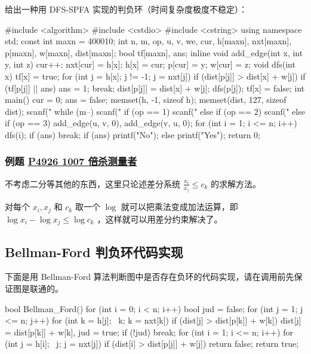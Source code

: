给出一种用 DFS-SPFA 实现的判负环（时间复杂度极度不稳定）：

\begin{cppcode}
#include <algorithm>
#include <cstdio>
#include <cstring>
using namespace std;
const int maxn = 400010;
int n, m, op, u, v, we, cur, h[maxn], nxt[maxn], p[maxn], w[maxn], dist[maxn];
bool tf[maxn], ans;
inline void add_edge(int x, int y, int z) {
  cur++;
  nxt[cur] = h[x];
  h[x] = cur;
  p[cur] = y;
  w[cur] = z;
}
void dfs(int x) {
  tf[x] = true;
  for (int j = h[x]; j != -1; j = nxt[j])
    if (dist[p[j]] > dist[x] + w[j]) {
      if (tf[p[j]] || ans) {
        ans = 1;
        break;
      }
      dist[p[j]] = dist[x] + w[j];
      dfs(p[j]);
    }
  tf[x] = false;
}
int main() {
  cur = 0;
  ans = false;
  memset(h, -1, sizeof h);
  memset(dist, 127, sizeof dist);
  scanf("%
  while (m--) {
    scanf("%
    if (op == 1)
      scanf("%
    else if (op == 2)
      scanf("%
    else if (op == 3)
      add_edge(u, v, 0), add_edge(v, u, 0);
  }
  for (int i = 1; i <= n; i++) {
    dfs(i);
    if (ans) break;
  }
  if (ans)
    printf("No\n");
  else
    printf("Yes\n");
  return 0;
}
\end{cppcode}

\subsubsection{例题 \href{https://www.luogu.org/problemnew/show/P4926}{P4926 1007  倍杀测量者}}

不考虑二分等其他的东西，这里只论述差分系统 $\frac{x_i}{x_j}\leq c_k$  的求解方法。

对每个 $x_i,x_j$ 和 $c_k$ 取一个 $\log$ 就可以把乘法变成加法运算，即 $\log x_i-\log x_j \leq \log c_k$  ，这样就可以用差分约束解决了。

\subsection{Bellman-Ford 判负环代码实现}

下面是用 Bellman-Ford 算法判断图中是否存在负环的代码实现，请在调用前先保证图是联通的。

\begin{cppcode}
bool Bellman_Ford() {
  for (int i = 0; i < n; i++) {
    bool jud = false;
    for (int j = 1; j <= n; j++)
      for (int k = h[j]; ~k; k = nxt[k])
        if (dist[j] > dist[p[k]] + w[k])
          dist[j] = dist[p[k]] + w[k], jud = true;
    if (!jud) break;
  }
  for (int i = 1; i <= n; i++)
    for (int j = h[i]; ~j; j = nxt[j])
      if (dist[i] > dist[p[j]] + w[j]) return false;
  return true;
}
\end{cppcode}

